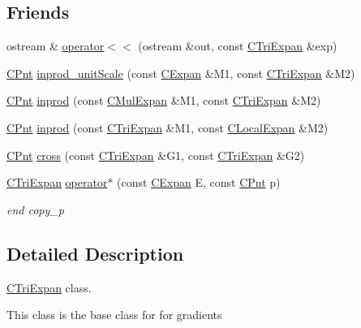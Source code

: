 \subsection*{Friends}
\begin{DoxyCompactItemize}
\item 
ostream \& \hyperlink{classCTriExpan_a64145b0a055e5980a76370aaebd25988}{operator$<$$<$} (ostream \&out, const \hyperlink{classCTriExpan}{C\-Tri\-Expan} \&exp)
\item 
\hyperlink{classCPnt}{C\-Pnt} \hyperlink{classCTriExpan_a8f7ba505b67b68b4f24c567a9ac3d1c4}{inprod\-\_\-unit\-Scale} (const \hyperlink{classCExpan}{C\-Expan} \&M1, const \hyperlink{classCTriExpan}{C\-Tri\-Expan} \&M2)
\item 
\hyperlink{classCPnt}{C\-Pnt} \hyperlink{classCTriExpan_ab4474d855cad0782c65a3066d366b46d}{inprod} (const \hyperlink{classCMulExpan}{C\-Mul\-Expan} \&M1, const \hyperlink{classCTriExpan}{C\-Tri\-Expan} \&M2)
\item 
\hyperlink{classCPnt}{C\-Pnt} \hyperlink{classCTriExpan_a8e124621a3ce0c71a23287968eb83f33}{inprod} (const \hyperlink{classCTriExpan}{C\-Tri\-Expan} \&M1, const \hyperlink{classCLocalExpan}{C\-Local\-Expan} \&M2)
\item 
\hyperlink{classCPnt}{C\-Pnt} \hyperlink{classCTriExpan_ad813a2b432680bed12a9ae458ac2666d}{cross} (const \hyperlink{classCTriExpan}{C\-Tri\-Expan} \&G1, const \hyperlink{classCTriExpan}{C\-Tri\-Expan} \&G2)
\item 
\hyperlink{classCTriExpan}{C\-Tri\-Expan} \hyperlink{classCTriExpan_a522fbb3365db1caccb7f624e764fbdd9}{operator$\ast$} (const \hyperlink{classCExpan}{C\-Expan} E, const \hyperlink{classCPnt}{C\-Pnt} p)
\begin{DoxyCompactList}\small\item\em end copy\-\_\-p \end{DoxyCompactList}\end{DoxyCompactItemize}


\subsection{Detailed Description}
\hyperlink{classCTriExpan}{C\-Tri\-Expan} class. 

This class is the base class for for gradients 

